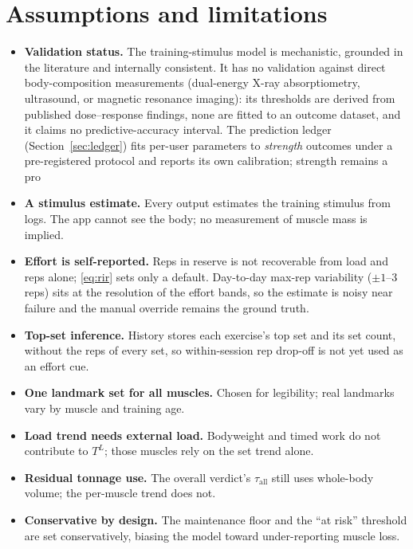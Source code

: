 \documentclass[11pt,a4paper]{article}
\begin{document}
\section{Assumptions and limitations}
\begin{itemize}[leftmargin=*]
\item \textbf{Validation status.} The training-stimulus model is mechanistic, grounded in the literature and internally consistent. It has no validation against direct body-composition measurements (dual-energy X-ray absorptiometry, ultrasound, or magnetic resonance imaging): its thresholds are derived from published dose--response findings, none are fitted to an outcome dataset, and it claims no predictive-accuracy interval. The prediction ledger (Section~\ref{sec:ledger}) fits per-user parameters to \emph{strength} outcomes under a pre-registered protocol and reports its own calibration; strength remains a pro
\item \textbf{A stimulus estimate.} Every output estimates the training stimulus from logs. The app cannot see the body; no measurement of muscle mass is implied.
\item \textbf{Effort is self-reported.} Reps in reserve is not recoverable from load and reps alone; \eqref{eq:rir} sets only a default. Day-to-day max-rep variability ($\pm 1$--3 reps) sits at the resolution of the effort bands, so the estimate is noisy near failure and the manual override remains the ground truth.
\item \textbf{Top-set inference.} History stores each exercise's top set and its set count, without the reps of every set, so within-session rep drop-off is not yet used as an effort cue.
\item \textbf{One landmark set for all muscles.} Chosen for legibility; real landmarks vary by muscle and training age.
\item \textbf{Load trend needs external load.} Bodyweight and timed work do not contribute to $T^{L}$; those muscles rely on the set trend alone.
\item \textbf{Residual tonnage use.} The overall verdict's $\tau_{\text{all}}$ still uses whole-body volume; the per-muscle trend does not.
\item \textbf{Conservative by design.} The maintenance floor and the ``at risk'' threshold are set conservatively, biasing the model toward under-reporting muscle loss.
\end{itemize}
\end{document}
